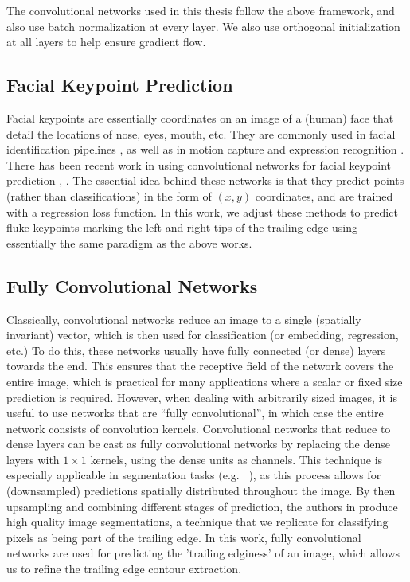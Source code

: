 The convolutional networks used in this thesis follow the above framework, and also use batch normalization \cite{ioffe2015batch} at every layer.
We also use orthogonal initialization \cite{saxe2013exact} at all layers to help ensure gradient flow.

\subsection{Facial Keypoint Prediction}

Facial keypoints are essentially coordinates on an image of a (human) face that detail the locations of nose, eyes, mouth, etc.
They are commonly used in facial identification pipelines \cite{taigman2014deepface}, as well as in motion capture \cite{akagi2013facial} and expression recognition \cite{berretti20113d}.
There has been recent work in using convolutional networks for facial keypoint prediction \cite{sun2013deep}, \cite{nouri2014using}. 
The essential idea behind these networks is that they predict points (rather than classifications) in the form of $(x, y)$ coordinates, and are trained with a regression loss function.
In this work, we adjust these methods to predict fluke keypoints marking the left and right tips of the trailing edge using essentially the same paradigm as the above works.

\subsection{Fully Convolutional Networks}

Classically, convolutional networks reduce an image to a single (spatially invariant) vector, which is then used for classification (or embedding, regression, etc.)
To do this, these networks usually have fully connected (or dense) layers towards the end.
This ensures that the receptive field of the network covers the entire image, which is practical for many applications where a scalar or fixed size prediction is required. 
However, when dealing with arbitrarily sized images, it is useful to use networks that are ``fully convolutional'', in which case the entire network consists of convolution kernels. 
Convolutional networks that reduce to dense layers can be cast as fully convolutional networks by replacing the dense layers with $1\times1$ kernels, using the dense units as channels.
This technique is especially applicable in segmentation tasks (e.g.\ \cite{ning2005toward} \cite{ciresan2012deep} \cite{hariharan2014simultaneous}), as this process allows for (downsampled) predictions spatially distributed throughout the image.
By then upsampling and combining different stages of prediction, the authors in \cite{long2015fully} produce high quality image segmentations, a technique that we replicate for classifying pixels as being part of the trailing edge.
In this work, fully convolutional networks are used for predicting the 'trailing edginess' of an image, which allows us to refine the trailing edge contour extraction. 

